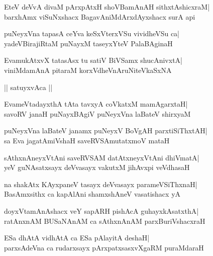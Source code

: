 \documentclass[twoside,12pt,openright]{book}
\newcounter{shloka}[chapter]
\begin{document}
\begin{shloka}%
EteV deVvA divaM pArxpAtxH shoVBamAnAH sithxtAshicxraM|\\
barxhAmx viSuNxshacx BagavAniMdArxdAyxshacx surA api
\end{shloka}

\begin{shloka}%
puNeyxVna tapasA ceYva keSxVterxVSu vividheVSu ca|\\
yadeVBirajiRtaM puNayxM taseyxYteV PalaBAginaH
\end{shloka}

\begin{shloka}%
EvamukAtxvX tatasAsx tu satiV BiVSamx shucAnivxtA|\\
viniMdamAnA pitaraM korxVdheVnAruNiteVkaSxNA
\end{shloka}

\begin{center}
|| satuyxvAca ||
\end{center}
\begin{shloka}%
EvameVtadayxthA tAta tavxyA coVkatxM mamAgarxtaH|\\
savoRV janaH puNayxBAgiV puNeyxVna laBateV shirxyaM
\end{shloka}

\begin{shloka}%
puNeyxVna laBateV janamx puNeyxV BoVgAH parxtiSiThxtAH|\\
sa Eva jagatAmiVshaH saveRVSAmutatxmoV mataH
\end{shloka}

\begin{shloka}%
sAthxnAneyxVtAni saveRVSAM datAtxneyxVtAni dhiVmatA|\\
yeV guNAsatxsayx deVvasayx vakutxM jihAvxpi veVdhasaH
\end{shloka}

\begin{shloka}%
na shakAtx KAyxpaneV tasayx deVvasayx parameVSiThxnaH|\\
BasAmxsithx ca kapAlAni shamxshAneV vasatishacx yA
\end{shloka}

\begin{shloka}%
doyxVtamAnAshacx veY sapARH pishAcA guhayxkAsatxthA|\\
ratAnxnAM BUSaNAnAM ca sAthxnAnAM parxBuriVshacxraH
\end{shloka}

\begin{shloka}%
ESa dhAtA vidhAtA ca ESa pAlayitA deshaH|\\
parxsAdeVna ca rudarxsayx pArxpatxsasxvXgaRM puraMdaraH
\end{shloka}
\end{document}

